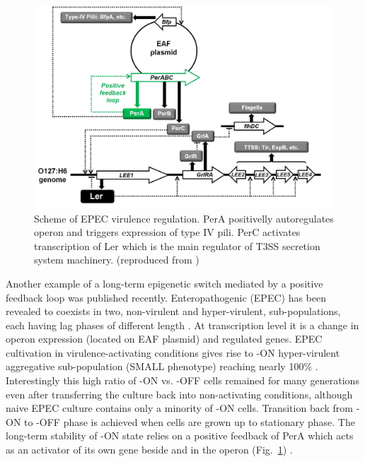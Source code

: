 \begin{figure}[ht!]
  \centering
  \includegraphics[scale=0.2]{text/Pictures/perOperonRegulation.jpg}
    \caption{Scheme of EPEC virulence regulation. PerA positivelly autoregulates  operon and triggers expression of type IV pili. PerC activates transcription of Ler which is the main regulator of T3SS secretion system machinery. (reproduced from \cite{ronin2017long})}
    \label{per}
\end{figure}

Another example of a long-term epigenetic switch mediated by a positive feedback loop was published recently.
Enteropathogenic  (EPEC) has been revealed to coexists in two, non-virulent and hyper-virulent, sub-populations, each having lag phases of different length \cite{ronin2017long}.
At transcription level it is a change in  operon expression (located on EAF plasmid) and  regulated genes.
EPEC cultivation in virulence-activating conditions gives rise to -ON hyper-virulent aggregative sub-population (SMALL phenotype) reaching nearly 100\% \cite{ronin2017long}.
Interestingly this high ratio of -ON vs. -OFF cells remained for many generations even after transferring the culture back into non-activating conditions, although naive EPEC culture contains only a minority of -ON cells.
Transition back from -ON to -OFF phase is achieved when cells are grown up to stationary phase.
The long-term stability of -ON state relies on a positive feedback of PerA which acts as an activator of its own gene beside  and  in the  operon (Fig.~\ref{per}) \cite{ibarra2003identification, ronin2017long}.


